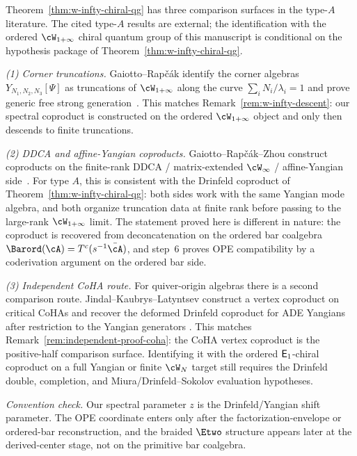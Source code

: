 \begin{remark}
\label{rem:grz-comparison}
Theorem~\ref{thm:w-infty-chiral-qg} has three comparison surfaces
in the type-$A$ literature. The cited type-$A$ results are external;
the identification with the ordered $\cW_{1+\infty}$ chiral quantum
group of this manuscript is conditional on the hypothesis package of
Theorem~\ref{thm:w-infty-chiral-qg}.

\smallskip
\noindent\emph{(1) Corner truncations.}
Gaiotto--Rap\v{c}\'ak identify the corner algebras
$Y_{N_1,N_2,N_3}[\Psi]$ as truncations of
$\cW_{1+\infty}$ along the curve
$\sum_i N_i/\lambda_i = 1$ and prove generic free strong
generation~\cite[Theorem~3.1 and eq.~3.35]{gaiotto-rapchak}.
This matches Remark~\ref{rem:w-infty-descent}: our spectral
coproduct is constructed on the ordered
$\cW_{1+\infty}$ object and only then descends to finite
truncations.

\smallskip
\noindent\emph{(2) DDCA and affine-Yangian coproducts.}
Gaiotto--Rap\v{c}\'ak--Zhou construct coproducts on the
finite-rank DDCA / matrix-extended $\cW_\infty$ /
affine-Yangian side~\cite[\S\S5--7]{GRZ25}. For type $A$,
this is consistent with the Drinfeld coproduct of
Theorem~\ref{thm:w-infty-chiral-qg}: both sides work with the
same Yangian mode algebra, and both organize truncation data at
finite rank before passing to the large-rank
$\cW_{1+\infty}$ limit. The statement proved here is different in
nature: the coproduct is recovered from deconcatenation on the
ordered bar coalgebra
$\Barord(\cA) = T^c(s^{-1}\bar{\cA})$, and step~6 proves OPE
compatibility by a coderivation argument on the ordered bar side.

\smallskip
\noindent\emph{(3) Independent CoHA route.}
For quiver-origin algebras there is a second comparison route.
Jindal--Kaubrys--Latyntsev construct a vertex coproduct on
critical CoHAs and recover the deformed Drinfeld coproduct for
ADE Yangians after restriction to the Yangian generators
\cite{JKL26}. This matches
Remark~\ref{rem:independent-proof-coha}: the CoHA vertex
coproduct is the positive-half comparison surface. Identifying it
with the ordered $\mathsf{E}_1$-chiral coproduct on a full Yangian or
finite $\cW_N$ target still requires the Drinfeld double,
completion, and Miura/Drinfeld--Sokolov evaluation hypotheses.

\smallskip
\noindent\emph{Convention check.}
Our spectral parameter $z$ is the Drinfeld/Yangian shift
parameter. The OPE coordinate enters only after the
factorization-envelope or ordered-bar reconstruction, and the
braided $\Etwo$ structure appears later at the derived-center
stage, not on the primitive bar coalgebra.


\end{remark}
